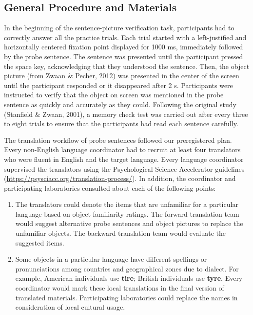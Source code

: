 \documentclass[
  man,floatsintext]{apa7}
\providecommand{\tightlist}{%
  \setlength{\itemsep}{0pt}\setlength{\parskip}{0pt}}
\begin{document}
\hypertarget{general-procedure-and-materials}{%
\subsection{General Procedure and Materials}\label{general-procedure-and-materials}}

In the beginning of the sentence-picture verification task, participants
had to correctly answer all the practice trials. Each trial started with
a left-justified and horizontally centered fixation point displayed for
1000 ms, immediately followed by the probe sentence. The sentence was
presented until the participant pressed the space key, acknowledging
that they understood the sentence. Then, the object picture (from Zwaan \& Pecher, 2012) was presented in the center of the
screen until the participant responded or it disappeared after 2 s.
Participants were instructed to verify that the object on screen was
mentioned in the probe sentence as quickly and accurately as they could.
Following the original study (Stanfield \& Zwaan, 2001), a memory check
test was carried out after every three to eight trials to ensure that
the participants had read each sentence carefully.

The translation workflow of probe sentences followed our preregistered
plan. Every non-English language coordinator had to recruit at least
four translators who were fluent in English and the target language.
Every language coordinator supervised the translators using the
Psychological Science Accelerator guidelines
(\href{https://www.google.com/url?q=https://psysciacc.org/translation-process/\&sa=D\&source=docs\&ust=1680671843449808\&usg=AOvVaw2Lp4-G01CyfxaMyrZfwvmy}{https://psysciacc.org/translation-process/}).
In addition, the coordinator and participating laboratories consulted
about each of the following points:

\begin{enumerate}
\def\labelenumi{\arabic{enumi})}
\tightlist
\item
  The translators could denote the items that are unfamiliar for a
  particular language based on object familiarity ratings. The forward
  translation team would suggest alternative probe sentences and object
  pictures to replace the unfamiliar objects. The backward translation
  team would evaluate the suggested items.
\item
  Some objects in a particular language have different spellings or
  pronunciations among countries and geographical zones due to dialect.
  For example, American individuals use \textbf{tire}; British individuals use
  \textbf{tyre}. Every coordinator would mark these local translations in the
  final version of translated materials. Participating laboratories could
  replace the names in consideration of local cultural usage.
\end{enumerate}
\end{document}
